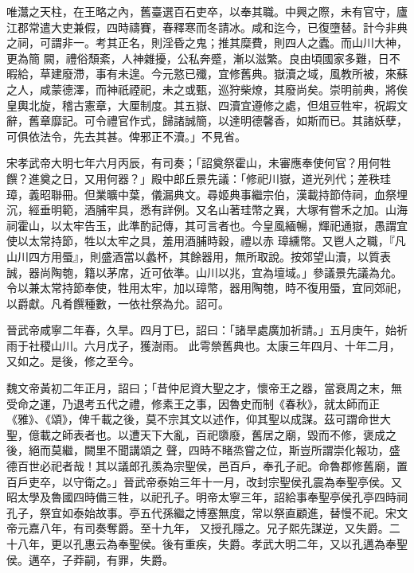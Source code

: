 \begin{pinyinscope}
 唯灊之天柱，在王略之內，舊臺選百石吏卒，以奉其職。中興之際，未有官守，廬江郡常遣大吏兼假，四時禱賽，春釋寒而冬請冰。咸和迄今，已復墮替。計今非典之祠，可謂非一。考其正名，則淫昏之鬼；推其糜費，則四人之蠹。而山川大神，更為簡
 闕，禮俗頹紊，人神雜擾，公私奔蹙，漸以滋繁。良由頃國家多難，日不暇給，草建廢滯，事有未遑。今元憝已殲，宜修舊典。嶽瀆之域，風教所被，來蘇之人，咸蒙德澤，而神祇禋祀，未之或甄，巡狩柴燎，其廢尚矣。崇明前典，將俟皇輿北旋，稽古憲章，大厘制度。其五嶽、四瀆宜遵修之處，但俎豆牲牢，祝嘏文辭，舊章靡記。可令禮官作式，歸諸誠簡，以達明德馨香，如斯而已。其諸妖孽，可俱依法令，先去其甚。俾邪正不瀆。」不見省。



 宋孝武帝大明七年六月丙辰，有司奏；「詔奠祭霍山，未審應奉使何官？用何牲饌？進奠之日，又用何器？」殿中郎丘景先議：「修祀川嶽，道光列代；差秩珪璋，義昭聯冊。但業曠中葉，儀漏典文。尋姬典事繼宗伯，漢載持節侍祠，血祭埋沉，經垂明範，酒脯牢具，悉有詳例。又名山著珪幣之異，大塚有嘗禾之加。山海祠霍山，以太牢告玉，此準酌記傳，其可言者也。今皇風緬暢，輝祀通嶽，愚謂宜使以太常持節，牲以太牢之具，羞用酒脯時穀，禮以赤
 璋纁幣。又鬯人之職，『凡山川四方用蜃』，則盛酒當以蠡杯，其餘器用，無所取說。按郊望山瀆，以質表誠，器尚陶匏，籍以茅席，近可依準。山川以兆，宜為壇域。」參議景先議為允。令以兼太常持節奉使，牲用太牢，加以璋幣，器用陶匏，時不復用蜃，宜同郊祀，以爵獻。凡肴饌種數，一依社祭為允。詔可。



 晉武帝咸寧二年春，久旱。四月丁巳，詔曰：「諸旱處廣加祈請。」五月庚午，始祈雨于社稷山川。六月戊子，獲澍雨。
 此雩禜舊典也。太康三年四月、十年二月，又如之。是後，修之至今。



 魏文帝黃初二年正月，詔曰；「昔仲尼資大聖之才，懷帝王之器，當衰周之末，無受命之運，乃退考五代之禮，修素王之事，因魯史而制《春秋》，就太師而正《雅》、《頌》，俾千載之後，莫不宗其文以述作，仰其聖以成謀。茲可謂命世大聖，億載之師表者也。以遭天下大亂，百祀隳廢，舊居之廟，毀而不修，褒成之後，絕而莫繼，闕里不聞講頌之
 聲，四時不睹烝嘗之位，斯豈所謂崇化報功，盛德百世必祀者哉！其以議郎孔羨為宗聖侯，邑百戶，奉孔子祀。命魯郡修舊廟，置百戶吏卒，以守衛之。」晉武帝泰始三年十一月，改封宗聖侯孔震為奉聖亭侯。又昭太學及魯國四時備三牲，以祀孔子。明帝太寧三年，詔給事奉聖亭侯孔亭四時祠孔子，祭宜如泰始故事。亭五代孫繼之博塞無度，常以祭直顧進，替慢不祀。宋文帝元嘉八年，有司奏奪爵。至十九年，
 又授孔隱之。兄子熙先謀逆，又失爵。二十八年，更以孔惠云為奉聖侯。後有重疾，失爵。孝武大明二年，又以孔邁為奉聖侯。邁卒，子莽嗣，有罪，失爵。




\end{pinyinscope}
